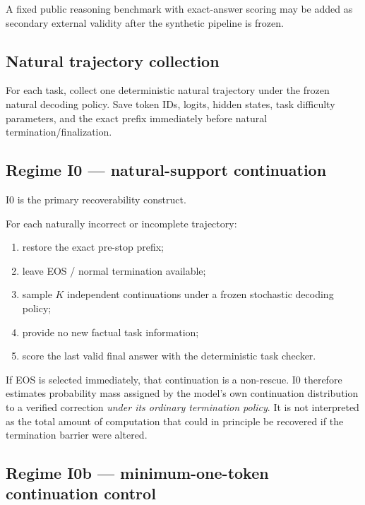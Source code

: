 A fixed public reasoning benchmark with exact-answer scoring may be added as secondary external validity after the synthetic pipeline is frozen.

\subsection{Natural trajectory collection}\label{natural-trajectory-collection}

For each task, collect one deterministic natural trajectory under the frozen natural decoding policy. Save token IDs, logits, hidden states, task difficulty parameters, and the exact prefix immediately before natural termination/finalization.

\subsection{Regime I0 --- natural-support continuation}\label{counterfactual-i0-natural-support}

I0 is the primary recoverability construct.

For each naturally incorrect or incomplete trajectory:

\begin{enumerate}
\tightlist
\item restore the exact pre-stop prefix;
\item leave EOS / normal termination available;
\item sample \(K\) independent continuations under a frozen stochastic decoding policy;
\item provide no new factual task information;
\item score the last valid final answer with the deterministic task checker.
\end{enumerate}

If EOS is selected immediately, that continuation is a non-rescue. I0 therefore estimates probability mass assigned by the model's own continuation distribution to a verified correction \emph{under its ordinary termination policy}. It is not interpreted as the total amount of computation that could in principle be recovered if the termination barrier were altered.

\subsection{Regime I0b --- minimum-one-token continuation control}\label{counterfactual-i0b-minimum-one-token}

